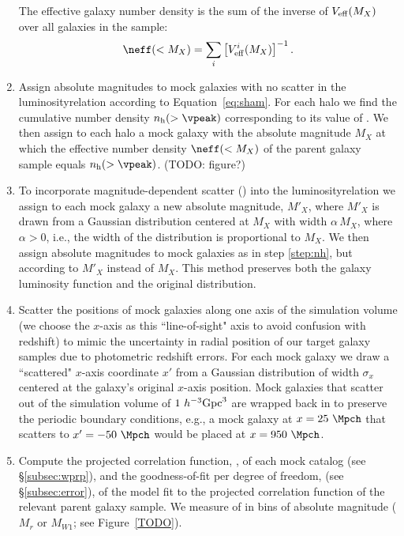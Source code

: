 \documentclass[twocolumn,apj,iop,tighten]{emulateapj2}
\begin{document}
\begin{enumerate}[leftmargin=0pt, itemindent=24pt, listparindent=10pt, label=(\arabic*), nosep]
The effective galaxy number density is the sum of the inverse of $V_{\rm eff}(M_X)$ over all galaxies in the sample:
%
\begin{equation}\label{eq:neff}
  \neff(<M_X) = \sum_i \left[ V^i_{\rm eff}(M_X) \right]^{-1}.
\end{equation}
%
\item \label{step:nh}
Assign absolute magnitudes to mock galaxies with no scatter in the luminosity\textendash \vpeak relation according to Equation~\ref{eq:sham}. For each halo we find the cumulative number density $n_{\rm h}(>\vpeak)$ corresponding to its value of \vpeak. We then assign to each halo a mock galaxy with the absolute magnitude $M_X$ at which the effective number density $\neff(<M_X)$ of the parent galaxy sample equals $n_{\rm h}(>\vpeak)$. (TODO: figure?)
%
\item \label{step:sham_scatter}
To incorporate magnitude-dependent scatter (\sigmamag) into the luminosity\textendash \vpeak relation we assign to each mock galaxy a new absolute magnitude, $M'_X$, where $M'_X$ is drawn from a Gaussian distribution centered at $M_X$ with width $\alpha\,M_X$, where $\alpha>0$, i.e., the width of the distribution is proportional to $M_X$. We then assign absolute magnitudes to mock galaxies as in step \ref{step:nh}, but according to $M'_X$ instead of $M_X$. This method preserves both the galaxy luminosity function and the original \vpeak distribution.
%
\item \label{step:los_scatter}
Scatter the positions of mock galaxies along one axis of the simulation volume (we choose the $x$-axis as this ``line-of-sight" axis to avoid confusion with redshift) to mimic the uncertainty in radial position of our target galaxy samples due to photometric redshift errors. For each mock galaxy we draw a ``scattered" $x$-axis coordinate $x'$ from a Gaussian distribution of width $\sigma_x$ centered at the galaxy's original $x$-axis position. Mock galaxies that scatter out of the simulation volume of $1~h^{-3}{\rm Gpc}^3$ are wrapped back in to preserve the periodic boundary conditions, e.g., a mock galaxy at $x=25~\Mpch$ that scatters to $x'=-50~\Mpch$ would be placed at $x=950~\Mpch$.
%
\item \label{step:model_wp}
Compute the projected correlation function, \wprp, of each mock catalog (see \S\ref{subsec:wprp}), and the goodness-of-fit per degree of freedom, \chisqred (see \S\ref{subsec:error}), of the model fit to the projected correlation function of the relevant parent galaxy sample. We measure \chisqred of \wprp in bins of absolute magnitude ($M_r$ or $M_{W1}$; see Figure~\ref{TODO}).

\end{enumerate}
\end{document}
